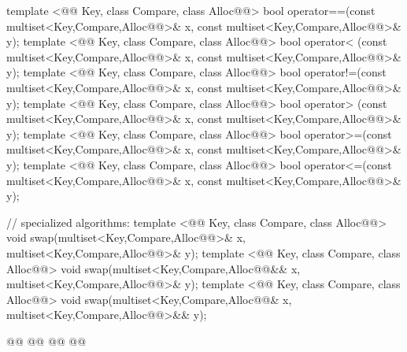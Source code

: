 \documentclass[american,twoside]{book}
\begin{document}
\begin{codeblock}
{  template <@@ Key, class Compare, class Alloc@@>
    bool operator==(const multiset<Key,Compare,Alloc@@>& x,
                    const multiset<Key,Compare,Alloc@@>& y);
  template <@@ Key, class Compare, class Alloc@@>
    bool operator< (const multiset<Key,Compare,Alloc@@>& x,
                    const multiset<Key,Compare,Alloc@@>& y);
  template <@@ Key, class Compare, class Alloc@@>
    bool operator!=(const multiset<Key,Compare,Alloc@@>& x,
                    const multiset<Key,Compare,Alloc@@>& y);
  template <@@ Key, class Compare, class Alloc@@>
    bool operator> (const multiset<Key,Compare,Alloc@@>& x,
                    const multiset<Key,Compare,Alloc@@>& y);
  template <@@ Key, class Compare, class Alloc@@>
    bool operator>=(const multiset<Key,Compare,Alloc@@>& x,
                    const multiset<Key,Compare,Alloc@@>& y);
  template <@@ Key, class Compare, class Alloc@@>
    bool operator<=(const multiset<Key,Compare,Alloc@@>& x,
                    const multiset<Key,Compare,Alloc@@>& y);

  // specialized algorithms:
  template <@@ Key, class Compare, class Alloc@@>
    void swap(multiset<Key,Compare,Alloc@@>& x,
              multiset<Key,Compare,Alloc@@>& y);
  template <@@ Key, class Compare, class Alloc@@>
    void swap(multiset<Key,Compare,Alloc@@&& x,
              multiset<Key,Compare,Alloc@@>& y);
  template <@@ Key, class Compare, class Alloc@@>
    void swap(multiset<Key,Compare,Alloc@@& x,
              multiset<Key,Compare,Alloc@@>&& y);

  @@
    @@
      @@
        @@
}
\end{codeblock}%
%
\end{document}

